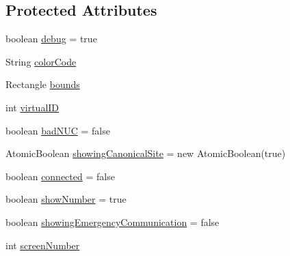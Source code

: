 \subsection*{Protected Attributes}
\begin{DoxyCompactItemize}
\item 
boolean \hyperlink{classgov_1_1fnal_1_1ppd_1_1dd_1_1display_1_1client_1_1ConnectionToBrowserInstance_a57bceb8b82e134109a2508b5d7832065}{debug} = true
\item 
String \hyperlink{classgov_1_1fnal_1_1ppd_1_1dd_1_1display_1_1client_1_1ConnectionToBrowserInstance_a487fdde372e9eaafe1b9a7f83d43db23}{color\-Code}
\item 
Rectangle \hyperlink{classgov_1_1fnal_1_1ppd_1_1dd_1_1display_1_1client_1_1ConnectionToBrowserInstance_a770b2f3f6f6e76626e45f2d73b23bd52}{bounds}
\item 
int \hyperlink{classgov_1_1fnal_1_1ppd_1_1dd_1_1display_1_1client_1_1ConnectionToBrowserInstance_a46edc5a7bac5d819516ff0092d7478e8}{virtual\-I\-D}
\item 
boolean \hyperlink{classgov_1_1fnal_1_1ppd_1_1dd_1_1display_1_1client_1_1ConnectionToBrowserInstance_aefdf61dc2db3974e98e8b1bc1fcd1807}{bad\-N\-U\-C} = false
\item 
Atomic\-Boolean \hyperlink{classgov_1_1fnal_1_1ppd_1_1dd_1_1display_1_1client_1_1ConnectionToBrowserInstance_a12d7a10dc47c1461bfa3bb74321330b3}{showing\-Canonical\-Site} = new Atomic\-Boolean(true)
\item 
boolean \hyperlink{classgov_1_1fnal_1_1ppd_1_1dd_1_1display_1_1client_1_1ConnectionToBrowserInstance_a172b06dd963b6eac021f63cda74cab54}{connected} = false
\item 
boolean \hyperlink{classgov_1_1fnal_1_1ppd_1_1dd_1_1display_1_1client_1_1ConnectionToBrowserInstance_a2f2ffa53ac708358dde068e9e3b282ba}{show\-Number} = true
\item 
boolean \hyperlink{classgov_1_1fnal_1_1ppd_1_1dd_1_1display_1_1client_1_1ConnectionToBrowserInstance_a3c8f533f6a591788d98541e73420b126}{showing\-Emergency\-Communication} = false
\item 
int \hyperlink{classgov_1_1fnal_1_1ppd_1_1dd_1_1display_1_1client_1_1ConnectionToBrowserInstance_a987b6e9010a2a8638689aae316cd0063}{screen\-Number}
\end{DoxyCompactItemize}
